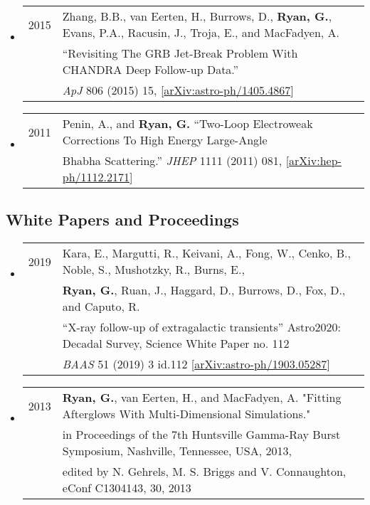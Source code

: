 \begin{itemize}
\item \begin{tabular}{ll}
2015 & Zhang, B.B., van Eerten, H., Burrows, D., {\bf Ryan, G.}, {Evans}, P.A., Racusin, J., Troja, E., and MacFadyen, A. \\
 & ``Revisiting The GRB Jet-Break Problem With CHANDRA Deep Follow-up Data.''  \\
&  \emph{ApJ} 806 (2015) 15, [\href{https://arxiv.org/abs/1405.4867}{arXiv:astro-ph/1405.4867}] \\
\end{tabular}

\item \begin{tabular}{ll}
2011 & Penin, A., and {\bf Ryan, G.}  ``Two-Loop Electroweak Corrections To High Energy Large-Angle \\& Bhabha Scattering.'' \emph{JHEP} 1111 (2011) 081, [\href{https://arxiv.org/abs/1112.2171}{arXiv:hep-ph/1112.2171}] \\
\end{tabular}
\end{itemize}

\subsection*{White Papers and Proceedings}
\begin{itemize}

\item \begin{tabular}{ll}
2019 & {Kara}, E., {Margutti}, R., {Keivani}, A., {Fong}, W., {Cenko}, B., {Noble}, S., {Mushotzky}, R., {Burns}, E., \\
	& {\bf {Ryan}, G.}, {Ruan}, J.,  {Haggard}, D., {Burrows}, D., {Fox}, D., and {Caputo}, R. \\
	& ``{X-ray follow-up of extragalactic transients}'' Astro2020: Decadal Survey, Science White Paper no. 112 \\
	& \emph{BAAS} 51 (2019) 3 id.112 [\href{https://arxiv.org/abs/1903.05287}{arXiv:astro-ph/1903.05287}]
\end{tabular}
\item \begin{tabular}{ll}
2013 & {\bf Ryan, G.}, van Eerten, H., and MacFadyen, A. "Fitting Afterglows With Multi-Dimensional Simulations." \\& in Proceedings of the 7th Huntsville Gamma-Ray Burst Symposium, Nashville, Tennessee, USA, 2013, \\& edited by N. Gehrels, M. S. Briggs and V. Connaughton, eConf C1304143, 30, 2013 \\
\end{tabular}
\end{itemize}

